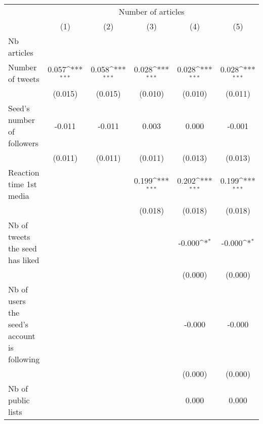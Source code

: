 {
\def\sym#1{\ifmmode^{#1}\else\(^{#1}\)\fi}
\begin{tabular}{l*{5}{c}}
\hline\hline
                    &\multicolumn{5}{c}{Number of articles}                                                                       \\\cmidrule(lr){2-6}
                    &\multicolumn{1}{c}{(1)}         &\multicolumn{1}{c}{(2)}         &\multicolumn{1}{c}{(3)}         &\multicolumn{1}{c}{(4)}         &\multicolumn{1}{c}{(5)}         \\
\hline
Nb articles         &                     &                     &                     &                     &                     \\
Number of tweets    &       0.057\sym{***}&       0.058\sym{***}&       0.028\sym{***}&       0.028\sym{***}&       0.028\sym{***}\\
                    &     (0.015)         &     (0.015)         &     (0.010)         &     (0.010)         &     (0.011)         \\
Seed's number of followers&      -0.011         &      -0.011         &       0.003         &       0.000         &      -0.001         \\
                    &     (0.011)         &     (0.011)         &     (0.011)         &     (0.013)         &     (0.013)         \\
Reaction time 1st media&                     &                     &       0.199\sym{***}&       0.202\sym{***}&       0.199\sym{***}\\
                    &                     &                     &     (0.018)         &     (0.018)         &     (0.018)         \\
Nb of tweets the seed has liked&                     &                     &                     &      -0.000\sym{*}  &      -0.000\sym{*}  \\
                    &                     &                     &                     &     (0.000)         &     (0.000)         \\
Nb of users the seed's account is following&                     &                     &                     &      -0.000         &      -0.000         \\
                    &                     &                     &                     &     (0.000)         &     (0.000)         \\
Nb of public lists  &                     &                     &                     &       0.000         &       0.000         \\

\end{tabular}}
